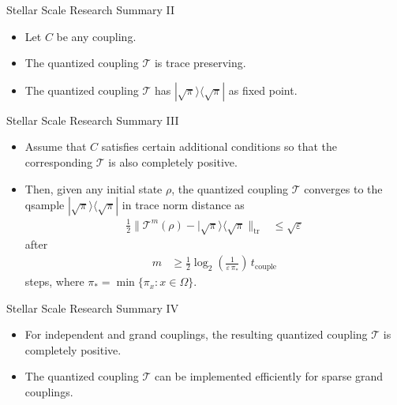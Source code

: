 \documentclass{beamer}
\renewcommand{\>}{\rangle}
\newcommand{\<}{\langle}
\newcommand{\cT}{\mathcal{T}}
\begin{document}

\begin{frame}{Stellar Scale Research Summary II}

\begin{itemize}
\item Let $C$ be any coupling.

\bigskip
\item The quantized coupling $\cT$ is trace preserving.

\bigskip
\item The quantized coupling $\cT$ has $|\sqrt{\pi}\>\<\sqrt{\pi}|$ as fixed point.

\end{itemize}
\end{frame}


\begin{frame}{Stellar Scale Research Summary III}

\begin{itemize}
\item Assume that $C$ satisfies certain additional conditions so that the corresponding $\cT$ is also completely positive.

\medskip
\item Then, given any initial state $\rho$, the quantized coupling $\cT$ converges to the qsample $|\sqrt{\pi}\>\<\sqrt{\pi}|$ in trace norm distance as
\begin{align*}
    \frac{1}{2} \big\| \cT^m(\rho) - |\sqrt{\pi}\>\<\sqrt{\pi} \big\|_\mathrm{tr}
    &\le 
    \sqrt{\varepsilon}
\end{align*}
after 
\begin{align*}
    m 
    &\ge 
    \frac{1}{2}\log_2 \left( 
    \frac{1}{\varepsilon \, \pi_*}
    \right) \, t_\mathrm{couple}
\end{align*}
steps, where $\pi_*=\min\{\pi_x : x \in \Omega\}$.
\end{itemize}
\end{frame}


\begin{frame}{Stellar Scale Research Summary IV}
\begin{itemize}
\item For independent and grand couplings, the resulting quantized coupling $\cT$ is completely positive.

\bigskip
\item The quantized coupling $\cT$ can be implemented efficiently for sparse grand couplings. 
\end{itemize}
\end{frame}
\end{document}
